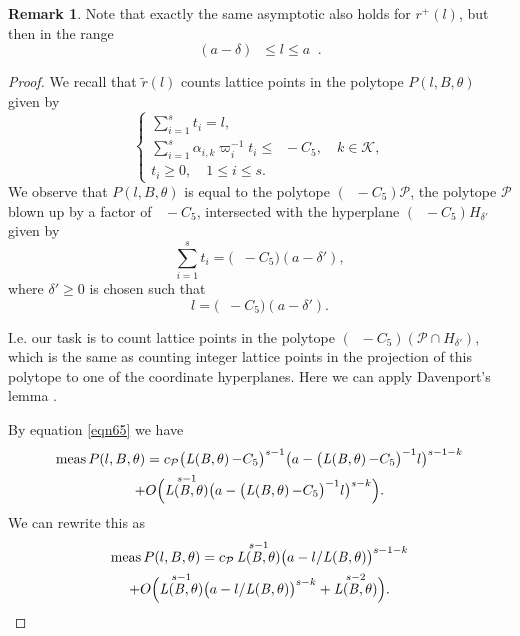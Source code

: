 \documentclass[JEP,XML,SOM,Unicode,published]{cedram}
\DeclareMathOperator{\LBt}{\mathit{L(B,\theta)}}
\let\del\delta
\let\tet\theta
\newcommand{\calK}{\mathcal{K}}
\newcommand{\calP}{\mathcal{P}}
\DeclareMathOperator{\meas}{meas}
\theoremstyle{definition}
\newtheorem{remark}[theorem]{Remark}
\numberwithin{theorem}{section}
\begin{document}
\begin{remark}
Note that exactly the same asymptotic also holds for $r^+(l)$, but then in the range\vspace*{-3pt}
\[
(a-\del) \LBt \leq l\leq a \LBt.
\]
\end{remark}

\begin{proof}
We recall that $\tilde{r}(l)$ counts lattice points in the polytope $P(l,B,\tet)$ given by\vspace*{-3pt}
\[
\begin{cases}
\sum_{i=1}^s t_i=l,\\
\sum_{i=1}^s \alpha_{i,k} \varpi_i^{-1}t_i \leq \LBt- C_5 ,\quad k\in \calK,\\
t_i\geq 0,\quad 1\leq i\leq s.
\end{cases}
\]
We observe that $P(l,B,\tet)$ is equal to the polytope $\left(\LBt -C_5\right)\calP$, \ie the polytope $\calP$ blown up by a factor of $\LBt-C_5$, intersected with the hyperplane $\left(\LBt -C_5\right) H_{\del'}$ given by\vspace*{-3pt}
\[
\sum_{i=1}^s t_i= \bigl(\LBt -C_5\bigr) (a-\del'),
\]
where $\del' \geq 0$ is chosen such that\vspace*{-3pt}
\[
l= \bigl(\LBt -C_5\bigr) (a-\del').
\]

I.e. our task is to count lattice points in the polytope $\left(\LBt -C_5\right)(\calP\cap H_{\del'})$, which is the same as counting integer lattice points in the projection of this polytope to one of the coordinate hyperplanes. Here we can apply Davenport's lemma \cite{davenport}.

By equation \eqref{eqn65} we have\vspace*{-3pt}
\begin{multline*}
\meas P(l,B,\tet)= c_{\calP} \bigl(\LBt-C_5\bigr)^{s-1} \bigl(a- \bigl(\LBt-C_5\bigr)^{-1}l\bigr)^{s-1-k} \\
+O\Bigl(\LBt^{s-1} \bigl(a-\bigl(\LBt-C_5\bigr)^{-1}l\bigr)^{s-k}\Bigr).
\end{multline*}
We can rewrite this as\vspace*{-3pt}
\begin{multline*}
\meas P(l,B,\tet)= c_{\calP} \LBt^{s-1} \bigl(a-l/{\LBt}\bigr)^{s-1-k} \\
+O\Bigl(\LBt^{s-1} \bigl(a-l/{\LBt}\bigr)^{s-k} + \LBt^{s-2}\Bigr).
\end{multline*}


\end{proof}
\end{document}
